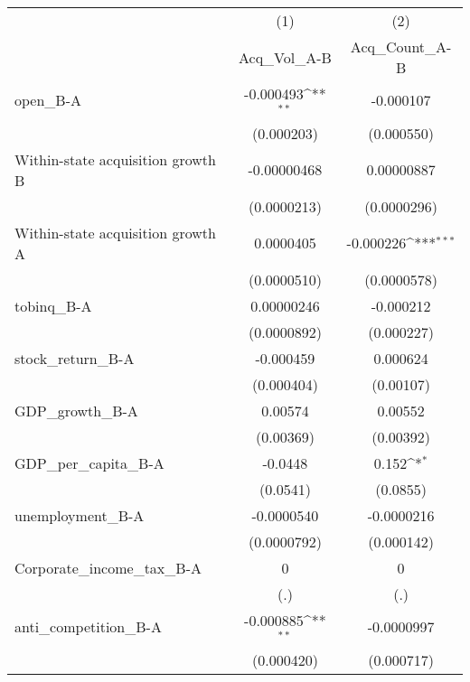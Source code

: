 {
\def\sym#1{\ifmmode^{#1}\else\(^{#1}\)\fi}
\begin{tabular}{l*{2}{c}}
\toprule
                    &\multicolumn{1}{c}{(1)}&\multicolumn{1}{c}{(2)}\\
                    &\multicolumn{1}{c}{Acq_Vol_A-B}&\multicolumn{1}{c}{Acq_Count_A-B}\\
\midrule
open_B-A            &   -0.000493\sym{**} &   -0.000107         \\
                    &  (0.000203)         &  (0.000550)         \\
\addlinespace
Within-state acquisition growth B& -0.00000468         &  0.00000887         \\
                    & (0.0000213)         & (0.0000296)         \\
\addlinespace
Within-state acquisition growth A&   0.0000405         &   -0.000226\sym{***}\\
                    & (0.0000510)         & (0.0000578)         \\
\addlinespace
tobinq_B-A          &  0.00000246         &   -0.000212         \\
                    & (0.0000892)         &  (0.000227)         \\
\addlinespace
stock_return_B-A    &   -0.000459         &    0.000624         \\
                    &  (0.000404)         &   (0.00107)         \\
\addlinespace
GDP_growth_B-A      &     0.00574         &     0.00552         \\
                    &   (0.00369)         &   (0.00392)         \\
\addlinespace
GDP_per_capita_B-A  &     -0.0448         &       0.152\sym{*}  \\
                    &    (0.0541)         &    (0.0855)         \\
\addlinespace
unemployment_B-A    &  -0.0000540         &  -0.0000216         \\
                    & (0.0000792)         &  (0.000142)         \\
\addlinespace
Corporate_income_tax_B-A&           0         &           0         \\
                    &         (.)         &         (.)         \\
\addlinespace
anti_competition_B-A&   -0.000885\sym{**} &  -0.0000997         \\
                    &  (0.000420)         &  (0.000717)         \\

\end{tabular}}
